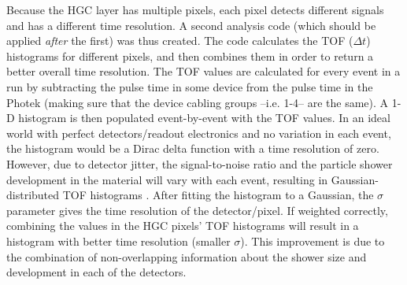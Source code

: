 \documentclass[twocolumn,aps,prd,reprint,superscriptaddress,floatfix]{revtex4-1}
\begin{document}
Because the HGC layer has multiple pixels, each pixel detects different signals and has a different time resolution. 
A second analysis code (which should be applied \textit{after} the first) was thus created.
The code calculates the TOF ($\Delta t$) histograms for different pixels, and then combines them in order to return a better overall time resolution. 
The TOF values are calculated for every event in a run by subtracting the pulse time in some device from the pulse time in the Photek (making sure that the device cabling groups --i.e. 1-4-- are the same). 
A 1-D histogram is then populated event-by-event with the TOF values. 
In an ideal world with perfect detectors/readout electronics and no variation in each event, the histogram would be a Dirac delta function with a time resolution of zero. 
However, due to detector jitter, the signal-to-noise ratio and the particle shower development in the material will vary with each event, resulting in Gaussian-distributed TOF histograms \cite{P2}. 
After fitting the histogram to a Gaussian, the $\sigma$ parameter gives the time resolution of the detector/pixel. 
If weighted correctly, combining the values in the HGC pixels' TOF histograms will result in a histogram with better time resolution (smaller $\sigma$). 
This improvement is due to the combination of non-overlapping information about the shower size and development in each of the detectors.
\end{document}
